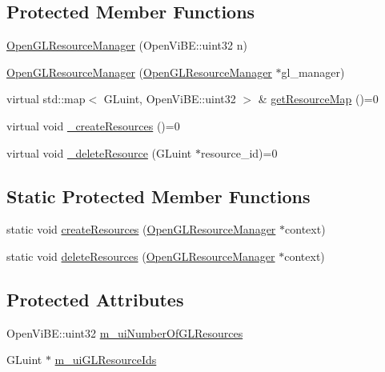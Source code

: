 \subsection*{Protected Member Functions}
\begin{DoxyCompactItemize}
\item 
\hyperlink{classOpenViBEApplications_1_1OpenGLResourceManager_a2ea76887f7e5cc9030636808df3f56a5}{OpenGLResourceManager} (OpenViBE::uint32 n)
\item 
\hyperlink{classOpenViBEApplications_1_1OpenGLResourceManager_ae130df054552d0b12623b7f99efaae4b}{OpenGLResourceManager} (\hyperlink{classOpenViBEApplications_1_1OpenGLResourceManager}{OpenGLResourceManager} $\ast$gl\_\-manager)
\item 
virtual std::map$<$ GLuint, OpenViBE::uint32 $>$ \& \hyperlink{classOpenViBEApplications_1_1OpenGLResourceManager_af0a41eeafdb23fe57f62898ae96c1fcd}{getResourceMap} ()=0
\item 
virtual void \hyperlink{classOpenViBEApplications_1_1OpenGLResourceManager_a857638930676e60788961b66fb2dc5b9}{\_\-createResources} ()=0
\item 
virtual void \hyperlink{classOpenViBEApplications_1_1OpenGLResourceManager_aec0d0b3c3a128fe18450e4d846838b16}{\_\-deleteResource} (GLuint $\ast$resource\_\-id)=0
\end{DoxyCompactItemize}
\subsection*{Static Protected Member Functions}
\begin{DoxyCompactItemize}
\item 
static void \hyperlink{classOpenViBEApplications_1_1OpenGLResourceManager_a0c738eb5b347c2c4fc2cc4ff3cd6ceef}{createResources} (\hyperlink{classOpenViBEApplications_1_1OpenGLResourceManager}{OpenGLResourceManager} $\ast$context)
\item 
static void \hyperlink{classOpenViBEApplications_1_1OpenGLResourceManager_a2a67ee37ee11a899421d76b4db922047}{deleteResources} (\hyperlink{classOpenViBEApplications_1_1OpenGLResourceManager}{OpenGLResourceManager} $\ast$context)
\end{DoxyCompactItemize}
\subsection*{Protected Attributes}
\begin{DoxyCompactItemize}
\item 
OpenViBE::uint32 \hyperlink{classOpenViBEApplications_1_1OpenGLResourceManager_ae11c8b4262f44ded66fdc1a5751c9327}{m\_\-uiNumberOfGLResources}
\item 
GLuint $\ast$ \hyperlink{classOpenViBEApplications_1_1OpenGLResourceManager_a2548a35c6cdacba3f3f162b57fc35065}{m\_\-uiGLResourceIds}
\end{DoxyCompactItemize}

